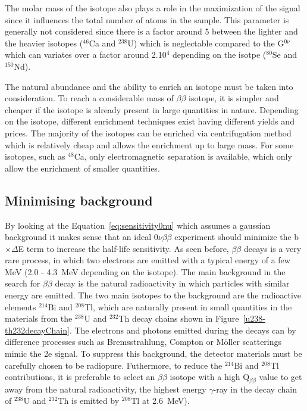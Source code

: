 \documentclass[main.tex]{subfiles}
\begin{document}
\bigskip


\NI The molar mass of the isotope also plays a role in the maximization of the signal since it influences the total number of atoms in the sample. This parameter is generally not considered since there is a factor around 5 between the lighter and the heavier  isotopes ($^{46}$Ca and $^{238}$U) which is neglectable compared to the G$^{\text{0}\nu}$ which can variates over a factor around 2.10$^{\text{4}}$ depending on the isotpe ($^{\text{80}}$Se and $^{\text{150}}$Nd). 


\bigskip


\NI The natural abundance and the ability to enrich an isotope must be taken into consideration. To reach a considerable mass of $\beta\beta$ isotope, it is simpler and cheaper if the isotope is already present in large quantities in nature. Depending on the isotope, different enrichment techniques exist having different yields and prices. The majority of the isotopes can be enriched via centrifugation method which is relatively cheap and allows the enrichment up to large mass. For some isotopes, such as $^{\text{48}}$Ca, only electromagnetic separation is available, which only allow the enrichment of smaller quantities.


\subsection{Minimising background}\label{sec:MinimisingBkg}


\NI By looking at the Equation~\ref{eq:sensitivity0nu} which assumes a gaussian background it makes sense that an ideal 0$\nu\beta\beta$ experiment should minimize the b$\times\Delta$E term to increase the half-life sensitivity. As seen before, $\beta\beta$ decays is a very rare process, in which two electrons are emitted with a typical energy of a few MeV (2.0 - 4.3~MeV depending on the isotope). The main background in the search for $\beta\beta$ decay is the natural radioactivity in which particles with similar energy are emitted. The two main isotopes to the background are the radioactive elements $^{\text{214}}$Bi and $^{\text{208}}$Tl, which are naturally present in small quantities in the materials from the $^{\text{238}}$U and $^{\text{232}}$Th decay chains shown in Figure~\ref{u238-th232decayChain}. The electrons and photons emitted during the decays can by difference processes such as Bremsstrahlung, Compton or Möller scatterings mimic the 2e signal. To suppress this background, the detector materials must be carefully chosen to be radiopure. Futhermore, to reduce the $^{\text{214}}$Bi and $^{\text{208}}$Tl contributions, it is preferable to select an $\beta\beta$ isotope with a high Q$_{\beta\beta}$ value to get away from the natural radioactivity, the highest energy $\gamma$-ray in the decay chain of $^{\text{238}}$U and $^{\text{232}}$Th is emitted by $^{\text{208}}$Tl at 2.6~MeV).
\end{document}
